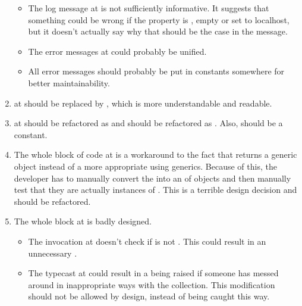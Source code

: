 \begin{enumerate}
\begin{itemize}
			\item The log message at  is not sufficiently informative. It suggests that something could be wrong if the  property is , empty or set to localhost, but it doesn't actually say why that should be the case in the message. 
			\item The error messages at  could probably be unified. 
			\item All error messages should probably be put in constants somewhere for better maintainability. 
		\end{itemize}
	\item {}  at  should be replaced by , which is more understandable and readable.
	\item {}  at  should be refactored as  and  should be refactored as . Also,  should be a constant. 
	\item {} The whole block of code at  is a workaround to the fact that  returns a generic  object instead of a more appropriate  using generics. Because of this, the developer has to manually convert the  into an  of  objects and then manually test that they are actually instances of . This is a terrible design decision and should be refactored.
	\item {} The whole  block at  is badly designed. 
		\begin{itemize}
			\item The invocation  at  doesn't check if  is not . This could result in an unnecessary . 
			\item The typecast at  could result in a  being raised if someone has messed around in inappropriate ways with the  collection. This modification should not be allowed by design, instead of being caught this way. 
		\end{itemize}

\end{enumerate}

